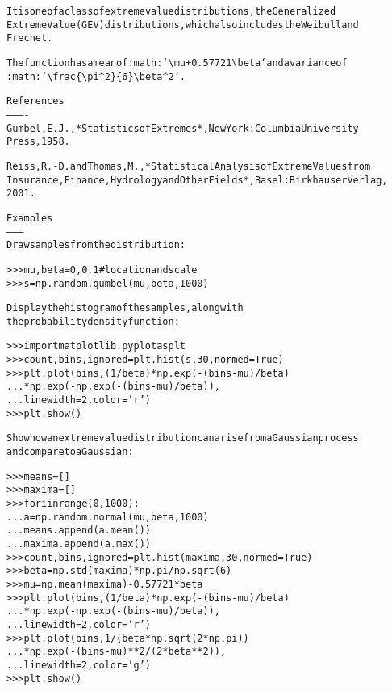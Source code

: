 \begin{boxedminipage}{\funcwidth}
\begin{alltt}
It is one of a class of extreme value distributions, the Generalized
Extreme Value (GEV) distributions, which also includes the Weibull and
Frechet.

The function has a mean of :math:`{\textbackslash}mu + 0.57721{\textbackslash}beta` and a variance of
:math:`{\textbackslash}frac\{{\textbackslash}pi{\textasciicircum}2\}\{6\}{\textbackslash}beta{\textasciicircum}2`.

References
----------
Gumbel, E. J., *Statistics of Extremes*, New York: Columbia University
Press, 1958.

Reiss, R.-D. and Thomas, M., *Statistical Analysis of Extreme Values from
Insurance, Finance, Hydrology and Other Fields*, Basel: Birkhauser Verlag,
2001.

Examples
--------
Draw samples from the distribution:

{\textgreater}{\textgreater}{\textgreater} mu, beta = 0, 0.1 \# location and scale
{\textgreater}{\textgreater}{\textgreater} s = np.random.gumbel(mu, beta, 1000)

Display the histogram of the samples, along with
the probability density function:

{\textgreater}{\textgreater}{\textgreater} import matplotlib.pyplot as plt
{\textgreater}{\textgreater}{\textgreater} count, bins, ignored = plt.hist(s, 30, normed=True)
{\textgreater}{\textgreater}{\textgreater} plt.plot(bins, (1/beta)*np.exp(-(bins - mu)/beta)
...          * np.exp( -np.exp( -(bins - mu) /beta) ),
...          linewidth=2, color='r')
{\textgreater}{\textgreater}{\textgreater} plt.show()

Show how an extreme value distribution can arise from a Gaussian process
and compare to a Gaussian:

{\textgreater}{\textgreater}{\textgreater} means = []
{\textgreater}{\textgreater}{\textgreater} maxima = []
{\textgreater}{\textgreater}{\textgreater} for i in range(0,1000) :
...    a = np.random.normal(mu, beta, 1000)
...    means.append(a.mean())
...    maxima.append(a.max())
{\textgreater}{\textgreater}{\textgreater} count, bins, ignored = plt.hist(maxima, 30, normed=True)
{\textgreater}{\textgreater}{\textgreater} beta = np.std(maxima)*np.pi/np.sqrt(6)
{\textgreater}{\textgreater}{\textgreater} mu = np.mean(maxima) - 0.57721*beta
{\textgreater}{\textgreater}{\textgreater} plt.plot(bins, (1/beta)*np.exp(-(bins - mu)/beta)
...          * np.exp(-np.exp(-(bins - mu)/beta)),
...          linewidth=2, color='r')
{\textgreater}{\textgreater}{\textgreater} plt.plot(bins, 1/(beta * np.sqrt(2 * np.pi))
...          * np.exp(-(bins - mu)**2 / (2 * beta**2)),
...          linewidth=2, color='g')
{\textgreater}{\textgreater}{\textgreater} plt.show()
\end{alltt}

\setlength{\parskip}{1ex}
    \end{boxedminipage}

